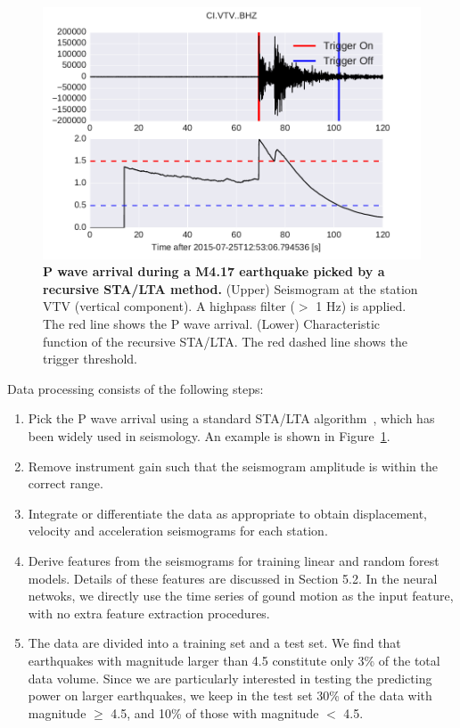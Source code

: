\documentclass{article} %
\begin{document}
\begin{figure}[ht!]
	\centering
	\includegraphics*[scale=0.5, viewport= -55mm 0mm 500mm 100mm, angle=0]{./figure/sta_lta.pdf}
	\caption{{\bf P wave arrival during a M4.17 earthquake picked by a recursive STA/LTA method.} (Upper) Seismogram at the station VTV (vertical component). A highpass filter ($>$ 1 Hz) is applied. The red line shows the P wave arrival. (Lower) Characteristic function of the recursive STA/LTA. The red dashed line shows the trigger threshold.}\label{sta_lta} %
\end{figure}

Data processing consists of the following steps:

\begin{enumerate}
\item Pick the P wave arrival using a standard STA/LTA algorithm~\cite{Withers1998}, which has been widely used in seismology. An example is shown in Figure~\ref{sta_lta}. 
\item Remove instrument gain such that the seismogram amplitude is within the correct range.
\item Integrate or differentiate the data as appropriate to obtain displacement, velocity and acceleration seismograms for each station.
\item Derive features from the seismograms for training linear and random forest models. Details of these features are discussed in Section 5.2.  In the neural netwoks, we directly use the time series of gound motion as the input feature, with no extra feature extraction procedures.

\item The data are divided into a training set and a test set. We find that earthquakes with magnitude larger than 4.5 constitute only 3\% of the total data volume. Since we are particularly interested in testing the predicting power on larger earthquakes, we keep in the test set 30\% of the data with magnitude $\geq$ 4.5, and 10\% of those with magnitude $<$ 4.5.

\end{enumerate}
\end{document}
